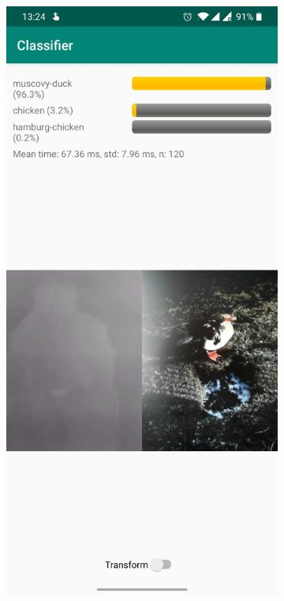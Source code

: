 \documentclass{l4proj}
\begin{document}
\begin{figure}[ht]
  \centering
  \begin{subfigure}[h!]{0.3\textwidth}
    \includegraphics[width=\textwidth, trim={0cm, 22cm, 0cm, 0cm}, clip]{images/app/screenshot_0.jpg}

\end{subfigure}
\end{figure}
\end{document}

